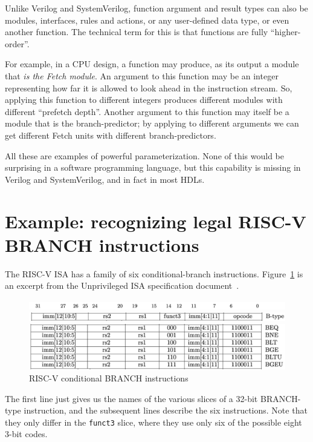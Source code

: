 Unlike Verilog and SystemVerilog, {\BSV} function argument and result
types can also be modules, interfaces, rules and actions, or any
user-defined data type, or even another function.  The technical term
for this is that {\BSV} functions are fully ``higher-order''.

For example, in a CPU design, a {\BSV} function may produce, as its
output a module that \emph{is the Fetch module}.  An argument to this
function may be an integer representing how far it is allowed to look
ahead in the instruction stream.  So, applying this function to
different integers produces different modules with different
``prefetch depth''.  Another argument to this function may itself be a
module that is the branch-predictor; by applying to different
arguments we can get different Fetch units with different
branch-predictors.

All these are examples of powerful parameterization.  None of this
would be surprising in a software programming language, but this
capability is missing in Verilog and SystemVerilog, and in fact in
most HDLs.


\section{Example: recognizing legal RISC-V BRANCH instructions}

The RISC-V ISA has a family of six conditional-branch instructions.
Figure~\ref{Fig_Combo_BRANCH_instrs} is an excerpt from the Unprivileged ISA
specification document~\cite{RISCV_Unpriv_2019_12_13}.
\begin{figure}[htbp]
  \centerline{\includegraphics[width=6in,angle=0]{Figures/Fig_Combo_BRANCH_instrs_1}}
  \centerline{\includegraphics[width=6in,angle=0]{Figures/Fig_Combo_BRANCH_instrs_2}}
  \vspace{2mm}
  \centerline{\includegraphics[width=6in,angle=0]{Figures/Fig_Combo_BRANCH_instrs_3}}
  \caption{\label{Fig_Combo_BRANCH_instrs}RISC-V conditional BRANCH instructions}
\end{figure}
The first line just gives us the names of the various slices of a
32-bit BRANCH-type instruction, and the subsequent lines describe the
six instructions.  Note that they only differ in the \verb|funct3|
slice, where they use only six of the possible eight 3-bit codes.

